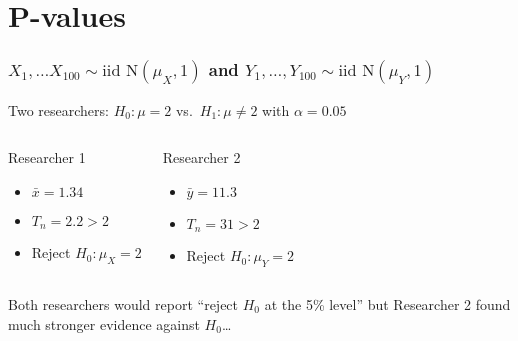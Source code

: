 \section{P-values}
\begin{frame}
  \frametitle{$X_1, \dots X_{100} \sim \mbox{iid N}(\mu_X, 1)$ and $Y_1, \dots, Y_{100}\sim \mbox{iid N}(\mu_Y, 1)$}
  Two researchers: $H_0\colon \mu = 2$ vs.\ $H_1\colon \mu \neq 2$ with $\alpha = 0.05$

\begin{columns}
  \begin{block}{Researcher 1}
    \begin{itemize}
      \item $\bar{x} = 1.34$
      \item $T_n = 2.2 > 2$
      \item Reject $H_0\colon \mu_X = 2$ 
    \end{itemize}
  \end{block}

  \begin{block}{Researcher 2}
    \begin{itemize}
      \item $\bar{y} = 11.3$
      \item $T_n = 31 > 2$
      \item Reject $H_0\colon \mu_Y = 2$
    \end{itemize}
  \end{block}
\end{columns}

\vspace{1em}
\alert{Both researchers would report ``reject $H_0$ at the 5\% level'' but Researcher 2 found much stronger evidence against $H_0$\dots}

\end{frame}
